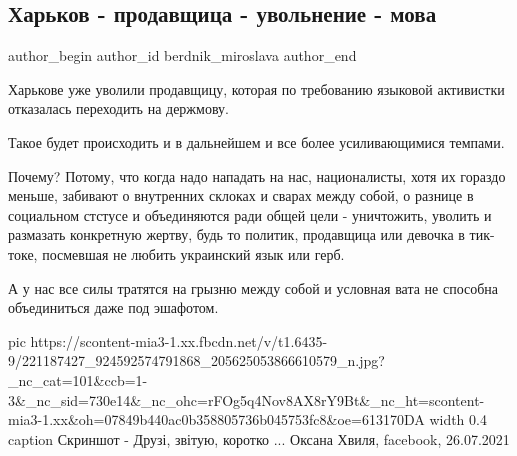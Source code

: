  
 
 
 
 
 
\subsection{Харьков - продавщица - увольнение - мова}
\label{sec:26_07_2021.fb.berdnik_miroslava.3.harkov_prodavschica}
 
\ifcmt
 author_begin
   author_id berdnik_miroslava
 author_end
\fi

Харькове уже уволили продавщицу, которая по требованию языковой активистки
отказалась переходить на держмову.

Такое будет происходить и в дальнейшем и все  более усиливающимися темпами.

Почему?  Потому,  что когда надо нападать на нас, националисты, хотя их гораздо
меньше, забивают о внутренних склоках и сварах между собой, о разнице в
социальном стстусе и объединяются ради общей цели - уничтожить, уволить и
размазать конкретную жертву, будь то политик, продавщица или девочка в
тик-токе, посмевшая не любить украинский язык или герб.

А у нас все силы тратятся на грызню между собой и условная вата не способна
объединиться даже под эшафотом.

\ifcmt
  pic https://scontent-mia3-1.xx.fbcdn.net/v/t1.6435-9/221187427_924592574791868_205625053866610579_n.jpg?_nc_cat=101&ccb=1-3&_nc_sid=730e14&_nc_ohc=rFOg5q4Nov8AX8rY9Bt&_nc_ht=scontent-mia3-1.xx&oh=07849b440ac0b358805736b045753fc8&oe=613170DA
  width 0.4
	caption Скриншот - Друзі, звітую, коротко ... Оксана Хвиля, facebook, 26.07.2021
\fi

